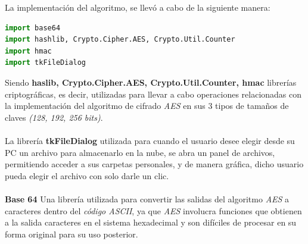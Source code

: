 La implementación del algoritmo, se llevó a cabo de la siguiente manera: 

\begin{lstlisting}[language=Python,frame=single, keywordstyle=\color{blue}]
import base64
import hashlib, Crypto.Cipher.AES, Crypto.Util.Counter
import hmac
import tkFileDialog
\end{lstlisting}

Siendo \textbf{haslib, Crypto.Cipher.AES, Crypto.Util.Counter, hmac} librerías criptográficas, es decir, utilizadas para llevar a cabo operaciones relacionadas con la implementación del algoritmo de cifrado \textit{AES} en sus 3 tipos de tamaños de claves \textit{(128, 192, 256 bits)}.\\ \\ 

La librería \textbf{tkFileDialog} utilizada para cuando el usuario desee elegir desde su PC un archivo para almacenarlo en la nube, se abra un panel de archivos, permitiendo acceder a sus carpetas personales, y de manera gráfica, dicho usuario pueda elegir el archivo con solo darle un clic. \\ \\ 

\textbf{Base 64} Una librería utilizada para convertir las salidas del algoritmo \textit{AES} a caracteres dentro del \textit{código ASCII}, ya que \textit{AES} involucra funciones que obtienen a la salida caracteres en el sistema hexadecimal y son difíciles de procesar en su forma original para su uso posterior. 

